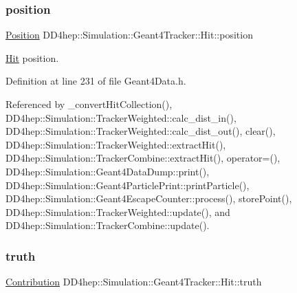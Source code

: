 \hypertarget{class_d_d4hep_1_1_simulation_1_1_geant4_tracker_1_1_hit_a7f992369c5178cac0cc00ffc8a9c36a0}{}\label{class_d_d4hep_1_1_simulation_1_1_geant4_tracker_1_1_hit_a7f992369c5178cac0cc00ffc8a9c36a0} 
\subsubsection{\texorpdfstring{position}{position}}
{\footnotesize\ttfamily \hyperlink{namespace_d_d4hep_1_1_geometry_a55083902099d03506c6db01b80404900}{Position} D\+D4hep\+::\+Simulation\+::\+Geant4\+Tracker\+::\+Hit\+::position}



\hyperlink{class_d_d4hep_1_1_simulation_1_1_geant4_tracker_1_1_hit}{Hit} position. 



Definition at line 231 of file Geant4\+Data.\+h.



Referenced by \+\_\+convert\+Hit\+Collection(), D\+D4hep\+::\+Simulation\+::\+Tracker\+Weighted\+::calc\+\_\+dist\+\_\+in(), D\+D4hep\+::\+Simulation\+::\+Tracker\+Weighted\+::calc\+\_\+dist\+\_\+out(), clear(), D\+D4hep\+::\+Simulation\+::\+Tracker\+Weighted\+::extract\+Hit(), D\+D4hep\+::\+Simulation\+::\+Tracker\+Combine\+::extract\+Hit(), operator=(), D\+D4hep\+::\+Simulation\+::\+Geant4\+Data\+Dump\+::print(), D\+D4hep\+::\+Simulation\+::\+Geant4\+Particle\+Print\+::print\+Particle(), D\+D4hep\+::\+Simulation\+::\+Geant4\+Escape\+Counter\+::process(), store\+Point(), D\+D4hep\+::\+Simulation\+::\+Tracker\+Weighted\+::update(), and D\+D4hep\+::\+Simulation\+::\+Tracker\+Combine\+::update().

\hypertarget{class_d_d4hep_1_1_simulation_1_1_geant4_tracker_1_1_hit_ab786ed42d3c88d911b662e8a083bc54e}{}\label{class_d_d4hep_1_1_simulation_1_1_geant4_tracker_1_1_hit_ab786ed42d3c88d911b662e8a083bc54e} 
\subsubsection{\texorpdfstring{truth}{truth}}
{\footnotesize\ttfamily \hyperlink{class_d_d4hep_1_1_simulation_1_1_geant4_hit_data_aec2f53237eac2db7d83dd03bca8719c5}{Contribution} D\+D4hep\+::\+Simulation\+::\+Geant4\+Tracker\+::\+Hit\+::truth}



